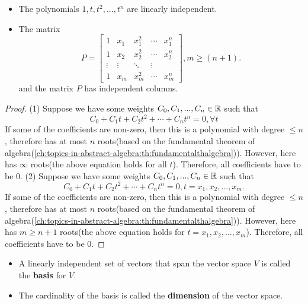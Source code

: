 \begin{refsection}
\begin{lemma}\label{ch:linearalgebra:th:LinearIndependenceOfPolynomials}\hfill
\begin{itemize}
	\item The polynomials $1,t,t^2,...,t^n$ are linearly independent.
	\item The matrix 
	$$P = \begin{bmatrix}
	1 & x_1 & x_1^2 & \cdots & x_1^n\\ 
	1 & x_2 & x_2^2 & \cdots & x_2^n \\ 
	\vdots & \vdots & \ddots & \vdots\\ 
	1 & x_m & x_m^2 & \cdots & x_m^n
	\end{bmatrix}, m \geq (n+1).$$
	and the matrix $P$ has independent columns.
\end{itemize}	
\end{lemma}
\begin{proof}
(1)	
Suppose we have some weights $C_0,C_1,...,C_n\in \mathbb{R}$ such that
$$C_0 + C_1 t + C_2 t^2 + \cdots + C_n t^n = 0, \forall t$$
If some of the coefficients are non-zero, then this is a polynomial with degree $\leq n$, therefore has at most $n$ roots(based on the fundamental theorem of algebra(\autoref{ch:topics-in-abstract-algebra:th:fundamentalthalgebra})). However, here has $\infty$ roots(the above equation holds for all $t$). Therefore, all coefficients have to be 0. 
(2) Suppose we have some weights $C_0,C_1,...,C_n\in \mathbb{R}$ such that
$$C_0 + C_1 t + C_2 t^2 + \cdots + C_n t^n = 0, t=x_1,x_2,...,x_m.$$If some of the coefficients are non-zero, then this is a polynomial with degree $\leq n$, therefore has at most $n$ roots(based on the fundamental theorem of algebra(\autoref{ch:topics-in-abstract-algebra:th:fundamentalthalgebra})). However, here has $m\geq n+1$ roots(the above equation holds for $t=x_1,x_2,...,x_m$). Therefore, all coefficients have to be 0. 
\end{proof}


\begin{definition}\hfill
\begin{itemize}
	\item A linearly independent set of vectors that span the vector space $V$ is called the \textbf{basis} for $V$. 
	\item The cardinality of the basis is called the \textbf{dimension} of the vector space. 
\end{itemize}	
\end{definition}




\end{refsection}
